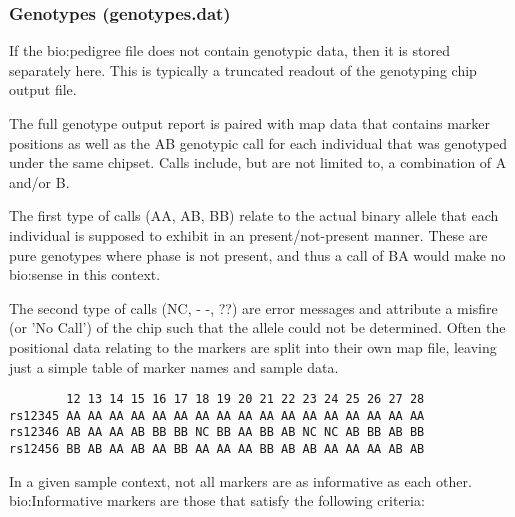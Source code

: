 \subsubsection{Genotypes (genotypes.dat)}

If the \gls{bio:pedigree} file does not contain genotypic data, then it is stored separately here. This is typically a truncated readout of the genotyping chip output file.

The full genotype output report is paired with map data that contains marker positions as well as the AB genotypic call for each individual that was genotyped under the same chipset. Calls include, but are not limited to, a combination of A and/or B.

The first type of calls (AA, AB, BB) relate to the actual binary allele that each individual is supposed to exhibit in an present/not-present manner. These are pure genotypes where phase is not present, and thus a call of BA would make no \gls{bio:sense} in this context.

The second type of calls (NC, - -, ??) are error messages and attribute a misfire (or 'No Call') of the chip such that the allele could not be determined.
Often the positional data relating to the markers are split into their own map file, leaving just a simple table of marker names and sample data.

\pagebreak

\begingroup
\vspace{10pt}
\begin{lstlisting}
        12 13 14 15 16 17 18 19 20 21 22 23 24 25 26 27 28
rs12345 AA AA AA AA AA AA AA AA AA AA AA AA AA AA AA AA AA
rs12346 AB AA AA AB BB BB NC BB AA BB AB NC NC AB BB AB BB
rs12456 BB AB AA AB AA BB AA AA AA BB AB AB AA AA AA AB AB
\end{lstlisting}
\vspace{-10pt}
\endgroup
\vspace{5pt}

In a given sample context, not all markers are as informative as each other. \gls{bio:Informative marker}s are those that satisfy the following criteria:\label{informativemarkers}

